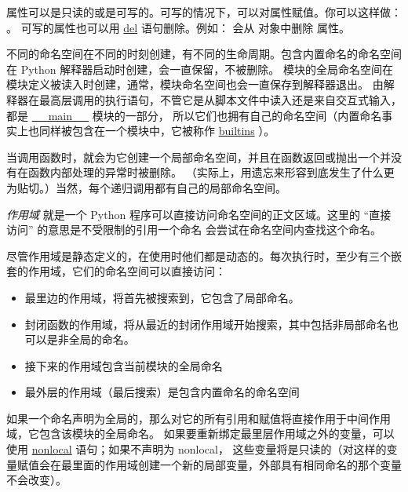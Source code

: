 \documentclass[a4paper,10pt,english]{sphinxmanual}
\begin{document}
属性可以是只读的或是可写的。可写的情况下，可以对属性赋值。你可以这样做：  。
可写的属性也可以用 \href{https://docs.python.org/3/reference/simple\_stmts.html\#del}{del} 语句删除。例如：  会从  对象中删除  属性。

不同的命名空间在不同的时刻创建，有不同的生命周期。包含内置命名的命名空间在 Python 解释器启动时创建，会一直保留，不被删除。
模块的全局命名空间在模块定义被读入时创建，通常，模块命名空间也会一直保存到解释器退出。
由解释器在最高层调用的执行语句，不管它是从脚本文件中读入还是来自交互式输入，
都是 \href{https://docs.python.org/3/library/\_\_main\_\_.html\#module-\_\_main\_\_}{\_\_main\_\_} 模块的一部分，
所以它们也拥有自己的命名空间（内置命名事实上也同样被包含在一个模块中，它被称作 \href{https://docs.python.org/3/library/builtins.html\#module-builtins}{builtins} ）。

当调用函数时，就会为它创建一个局部命名空间，并且在函数返回或抛出一个并没有在函数内部处理的异常时被删除。
（实际上，用遗忘来形容到底发生了什么更为贴切。）当然，每个递归调用都有自己的局部命名空间。

\emph{作用域} 就是一个 Python 程序可以直接访问命名空间的正文区域。这里的 ``直接访问'' 的意思是不受限制的引用一个命名
会尝试在命名空间内查找这个命名。

尽管作用域是静态定义的，在使用时他们都是动态的。每次执行时，至少有三个嵌套的作用域，它们的命名空间可以直接访问：
\begin{itemize}
\item {} 
最里边的作用域，将首先被搜索到，它包含了局部命名。

\item {} 
封闭函数的作用域，将从最近的封闭作用域开始搜索，其中包括非局部命名也可以是非全局的命名。

\item {} 
接下来的作用域包含当前模块的全局命名

\item {} 
最外层的作用域（最后搜索）是包含内置命名的命名空间

\end{itemize}

如果一个命名声明为全局的，那么对它的所有引用和赋值将直接作用于中间作用域，它包含该模块的全局命名。
如果要重新绑定最里层作用域之外的变量，可以使用 \href{https://docs.python.org/3/reference/simple\_stmts.html\#nonlocal}{nonlocal} 语句；如果不声明为 nonlocal，
这些变量将是只读的（对这样的变量赋值会在最里面的作用域创建一个新的局部变量，外部具有相同命名的那个变量不会改变）。
\end{document}
